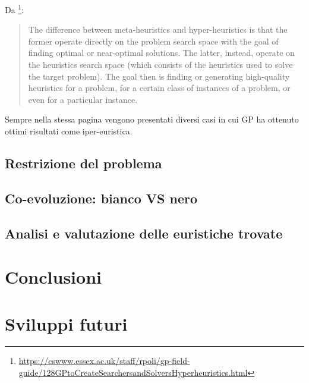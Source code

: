 \documentclass{../llncs}
\begin{document}
Da \footnote{\url{https://cswww.essex.ac.uk/staff/rpoli/gp-field-guide/128GPtoCreateSearchersandSolversHyperheuristics.html}}:
\begin{quote}
The difference between meta-heuristics and hyper-heuristics is that the former operate directly on the problem search space with the goal of finding optimal or near-optimal solutions. The latter, instead, operate on the heuristics search space (which consists of the heuristics used to solve the target problem). The goal then is finding or generating high-quality heuristics for a problem, for a certain class of instances of a problem, or even for a particular instance.
\end{quote}
Sempre nella stessa pagina vengono presentati diversi casi in cui GP ha ottenuto ottimi risultati come iper-euristica.

\subsection{Restrizione del problema}
\subsection{Co-evoluzione: bianco VS nero}
\subsection{Analisi e valutazione delle euristiche trovate}

\section{Conclusioni}

\section{Sviluppi futuri}

\clearpage


\printbibliography[heading=principali,filter=papers]
\printbibliography[heading=web,type=online]
\printbibliography[heading=integrative,type=report]
\end{document}
